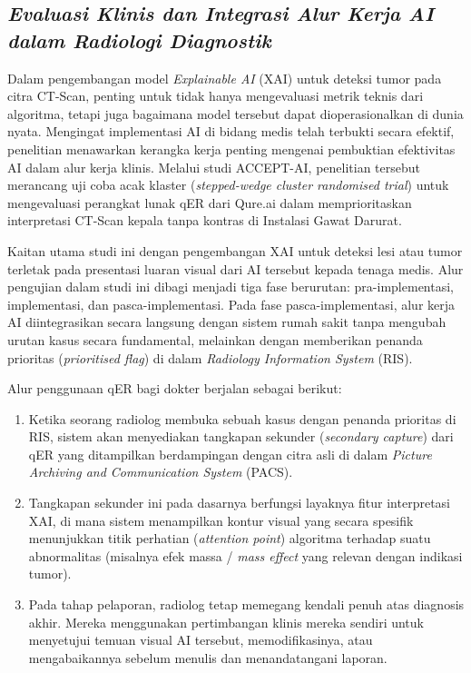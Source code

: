 \subsection{\textit{Evaluasi Klinis dan Integrasi Alur Kerja AI dalam Radiologi Diagnostik}}

Dalam pengembangan model \textit{Explainable AI} (XAI) untuk deteksi tumor pada citra CT-Scan, penting untuk tidak hanya mengevaluasi metrik teknis dari algoritma, tetapi juga bagaimana model tersebut dapat dioperasionalkan di dunia nyata. Mengingat implementasi AI di bidang medis telah terbukti secara efektif, penelitian \autocite{vimalesvaran2024assessing} menawarkan kerangka kerja penting mengenai pembuktian efektivitas AI dalam alur kerja klinis. Melalui studi ACCEPT-AI, penelitian tersebut merancang uji coba acak klaster (\textit{stepped-wedge cluster randomised trial}) untuk mengevaluasi perangkat lunak qER dari Qure.ai dalam memprioritaskan interpretasi CT-Scan kepala tanpa kontras di Instalasi Gawat Darurat.

Kaitan utama studi ini dengan pengembangan XAI untuk deteksi lesi atau tumor terletak pada presentasi luaran visual dari AI tersebut kepada tenaga medis. Alur pengujian dalam studi ini dibagi menjadi tiga fase berurutan: pra-implementasi, implementasi, dan pasca-implementasi. Pada fase pasca-implementasi, alur kerja AI diintegrasikan secara langsung dengan sistem rumah sakit tanpa mengubah urutan kasus secara fundamental, melainkan dengan memberikan penanda prioritas (\textit{prioritised flag}) di dalam \textit{Radiology Information System} (RIS).

Alur penggunaan qER bagi dokter berjalan sebagai berikut:
\begin{enumerate}
	\item Ketika seorang radiolog membuka sebuah kasus dengan penanda prioritas di RIS, sistem akan menyediakan tangkapan sekunder (\textit{secondary capture}) dari qER yang ditampilkan berdampingan dengan citra asli di dalam \textit{Picture Archiving and Communication System} (PACS).
	\item Tangkapan sekunder ini pada dasarnya berfungsi layaknya fitur interpretasi XAI, di mana sistem menampilkan kontur visual yang secara spesifik menunjukkan titik perhatian (\textit{attention point}) algoritma terhadap suatu abnormalitas (misalnya efek massa / \textit{mass effect} yang relevan dengan indikasi tumor).
	\item Pada tahap pelaporan, radiolog tetap memegang kendali penuh atas diagnosis akhir. Mereka menggunakan pertimbangan klinis mereka sendiri untuk menyetujui temuan visual AI tersebut, memodifikasinya, atau mengabaikannya sebelum menulis dan menandatangani laporan.
\end{enumerate}

